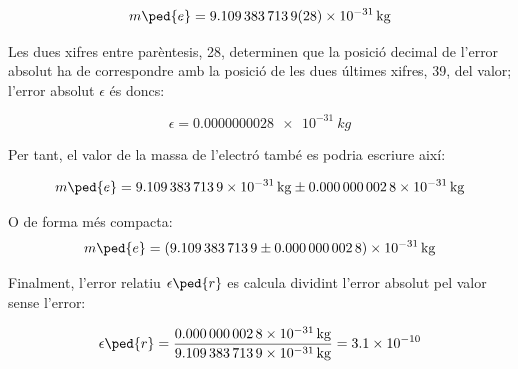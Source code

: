 \[
    m\ped{e} = \qty{9,109 383 7139(28) e-31}{kg}
\]

Les dues xifres entre parèntesis, 28, determinen que la posició decimal de l'error absolut ha de correspondre amb la posició de les dues últimes xifres, 39, del valor; l'error absolut $\epsilon$  és doncs:

\[
    \epsilon = \qty{0,000 000 0028 e-31}{kg}
\]

Per tant, el valor de la massa de l'electró també es podria escriure així:

 \[
    m\ped{e} = \qty[separate-uncertainty,separate-uncertainty-units = repeat]{9,109 383 7139(28) e-31}{kg}
\]

O de forma més compacta:
\[
m\ped{e} = \qty[separate-uncertainty,separate-uncertainty-units = bracket]{9,109 383 7139(28) e-31}{kg}
\]

Finalment, l'error relatiu $\epsilon\ped{r}$ es calcula dividint l'error absolut pel valor sense l'error:

\[
    \epsilon\ped{r} = \frac{\qty{0,000 000 0028 e-31}{kg}}{\qty{9,109 383 7139 e-31}{kg}} =   \num{3,1e-10}
\]
